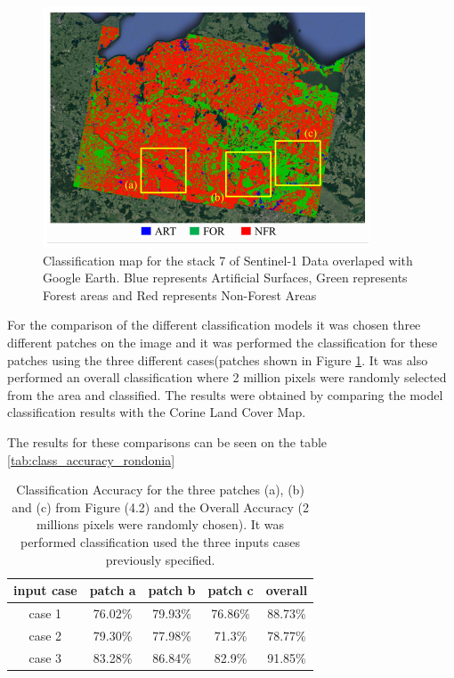 \begin{figure}[H]
    \centering
    \includegraphics{Cap4/classificacao3.png}
    \caption{Classification map for the stack 7 of Sentinel-1 Data overlaped with Google Earth. Blue represents Artificial Surfaces, Green represents Forest areas and Red represents Non-Forest Areas}
    \label{fig:classification_germany}
\end{figure}

For the comparison of the different classification models it was chosen three different patches on the image and it was performed the classification for these patches using the three different cases(patches shown in Figure \ref{fig:classification_germany}. It was also performed an overall classification where 2 million pixels were randomly selected from the area and classified. The results were obtained by comparing the model classification results with the Corine Land Cover Map.

The results for these comparisons can be seen on the table \ref{tab:class_accuracy_rondonia}

\begin{table}[H]
    \centering
    \begin{tabular}{c|c|c|c|c}
    \hline
         input case&patch a&patch b&patch c& overall  \\
         \hline
         case 1 & 76.02\%&79.93\%&76.86\%&88.73\%\\
         case 2 &79.30\%&77.98\%&71.3\%&78.77\%\\
         case 3&83.28\%&86.84\%&82.9\%&91.85\%\\
         \hline
         
    \end{tabular}
    \caption{Classification Accuracy for the three patches (a), (b) and (c) from Figure (4.2) and the Overall Accuracy (2 millions pixels were randomly chosen). It was performed classification used the three inputs cases previously specified.}
    \label{tab:class_accuracy_corine}
\end{table}

